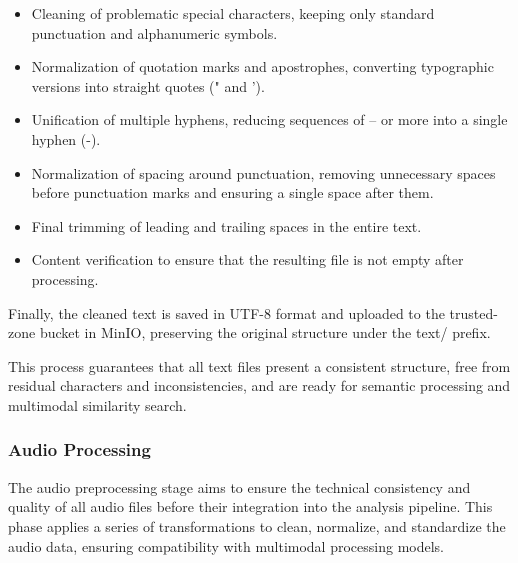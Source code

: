 \documentclass[12pt]{article}
\begin{document}
\begin{itemize}
    \item Cleaning of problematic special characters, keeping only standard punctuation and alphanumeric symbols.
\end{itemize}

\begin{itemize}
    \item Normalization of quotation marks and apostrophes, converting typographic versions into straight quotes (" and ').
\end{itemize}

\begin{itemize}
    \item Unification of multiple hyphens, reducing sequences of -- or more into a single hyphen (-).
\end{itemize}

\begin{itemize}
    \item Normalization of spacing around punctuation, removing unnecessary spaces before punctuation marks and ensuring a single space after them.
\end{itemize}

\begin{itemize}
    \item Final trimming of leading and trailing spaces in the entire text.
\end{itemize}

\begin{itemize}
    \item Content verification to ensure that the resulting file is not empty after processing.
\end{itemize}

Finally, the cleaned text is saved in UTF-8 format and uploaded to the trusted-zone bucket in MinIO, preserving the original structure under the text/ prefix.

This process guarantees that all text files present a consistent structure, free from residual characters and inconsistencies, and are ready for semantic processing and multimodal similarity search.

\subsubsection{Audio Processing}
The audio preprocessing stage aims to ensure the technical consistency and quality of all audio files before their integration into the analysis pipeline.
This phase applies a series of transformations to clean, normalize, and standardize the audio data, ensuring compatibility with multimodal processing models.
\end{document}
